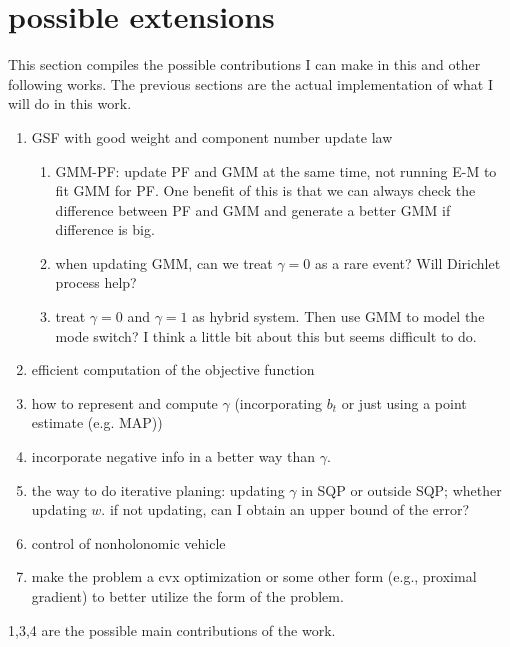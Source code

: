 \documentclass[letterpaper, 10 pt, conference]{ieeeconf}  %
\begin{document}
\section{possible extensions}
This section compiles the possible contributions I can make in this and other following works. The previous sections are the actual implementation of what I will do in this work.
\begin{enumerate}
	\item GSF with good weight and component number update law
		\begin{enumerate}
			\item GMM-PF: update PF and GMM at the same time, not running E-M to fit GMM for PF. One benefit of this is that we can always check the difference between PF and GMM and generate a better GMM if difference is big.
			\item when updating GMM, can we treat $\gamma=0$ as a rare event? Will Dirichlet process help?
			\item treat $\gamma=0$ and $\gamma=1$ as hybrid system. Then use GMM to model the mode switch? I think a little bit about this but seems difficult to do.
		\end{enumerate}
	\item efficient computation of the objective function
	\item how to represent and compute $\gamma$ (incorporating $b_t$ or just using a point estimate (e.g. MAP))
	\item incorporate negative info in a better way than $\gamma$.
	\item the way to do iterative planing: updating $\gamma$ in SQP or outside SQP; whether updating $w$. if not updating, can I obtain an upper bound of the error?
	\item control of nonholonomic vehicle
	\item make the problem a cvx optimization or some other form (e.g., proximal gradient) to better utilize the form of the problem.
\end{enumerate}
1,3,4 are the possible main contributions of the work.
\end{document}

